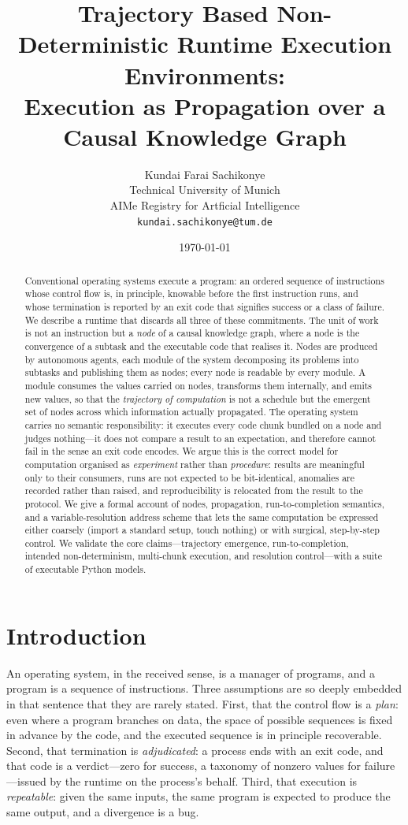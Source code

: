 \documentclass[11pt,a4paper,twocolumn]{article}
\title{Trajectory Based Non-Deterministic Runtime Execution Environments:\\
Execution as Propagation over a Causal Knowledge Graph}
\author{Kundai Farai Sachikonye\\
\small Technical University of Munich\\
\small AIMe Registry for Artficial Intelligence\\
\small \texttt{kundai.sachikonye@tum.de}}
\date{\today}
\theoremstyle{definition}
\begin{document}
\maketitle

\begin{abstract}
Conventional operating systems execute a program: an ordered sequence of
instructions whose control flow is, in principle, knowable before the first
instruction runs, and whose termination is reported by an exit code that
signifies success or a class of failure. We describe a runtime that discards
all three of these commitments. The unit of work is not an instruction but a
\emph{node} of a causal knowledge graph, where a node is the convergence of a
subtask and the executable code that realises it. Nodes are produced by
autonomous agents, each module of the system decomposing its problems into
subtasks and publishing them as nodes; every node is readable by every module.
A module consumes the values carried on nodes, transforms them internally, and
emits new values, so that the \emph{trajectory of computation} is not a schedule
but the emergent set of nodes across which information actually propagated. The
operating system carries no semantic responsibility: it executes every code
chunk bundled on a node and judges nothing---it does not compare a result to an
expectation, and therefore cannot fail in the sense an exit code encodes. We
argue this is the correct model for computation organised as \emph{experiment}
rather than \emph{procedure}: results are meaningful only to their consumers,
runs are not expected to be bit-identical, anomalies are recorded rather than
raised, and reproducibility is relocated from the result to the protocol. We
give a formal account of nodes, propagation, run-to-completion semantics, and a
variable-resolution address scheme that lets the same computation be expressed
either coarsely (import a standard setup, touch nothing) or with surgical,
step-by-step control. We validate the core claims---trajectory emergence,
run-to-completion, intended non-determinism, multi-chunk execution, and
resolution control---with a suite of executable Python models.
\end{abstract}

\tableofcontents

\section{Introduction}
\label{sec:intro}

An operating system, in the received sense, is a manager of programs, and a
program is a sequence of instructions. Three assumptions are so deeply
embedded in that sentence that they are rarely stated. First, that the control
flow is a \emph{plan}: even where a program branches on data, the space of
possible sequences is fixed in advance by the code, and the executed sequence is
in principle recoverable. Second, that termination is \emph{adjudicated}: a
process ends with an exit code, and that code is a verdict---zero for success, a
taxonomy of nonzero values for failure---issued by the runtime on the process's
behalf. Third, that execution is \emph{repeatable}: given the same inputs, the
same program is expected to produce the same output, and a divergence is a bug.
\end{document}
